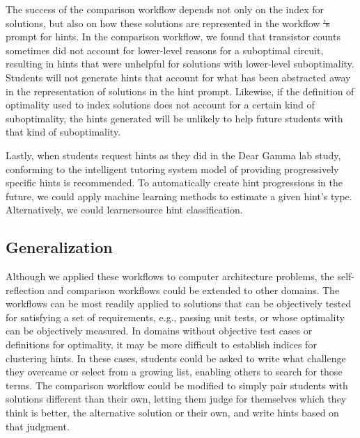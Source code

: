 \documentclass[12pt,twoside]{mitthesis}
\providecommand{\DIFdeltex}[1]{{\protect\color{red}\sout{#1}}}                      %
\providecommand{\DIFdelbegin}{} %
\providecommand{\DIFdelend}{} %
\providecommand{\DIFdel}[1]{\texorpdfstring{\DIFdeltex{#1}}{}} %
\begin{document}
The success of the comparison workflow depends not only on the index for solutions, but also on how these solutions are represented in the workflow \DIFdelbegin \DIFdel{'s }\DIFdelend prompt for hints. In the comparison workflow, we found that transistor counts sometimes did not account for lower-level reasons for a suboptimal circuit, resulting in hints that were unhelpful for solutions with lower-level suboptimality. Students will not generate hints that account for what has been abstracted away in the representation of solutions in the hint prompt. Likewise, if the definition of optimality used to index solutions does not account for a certain kind of suboptimality, the hints generated will be unlikely to help future students with that kind of suboptimality. 

Lastly, when students request hints as they did in the Dear Gamma lab study, conforming to the intelligent tutoring system model of providing progressively specific hints is recommended. To automatically create hint progressions in the future, we could apply machine learning methods to estimate a given hint's type. Alternatively, we could learnersource hint classification. 

\subsection{Generalization}
Although we applied these workflows to computer architecture problems, the self-reflection and comparison workflows could be extended to other domains. The workflows can be most readily applied to solutions that can be objectively tested for satisfying a set of requirements, e.g., passing unit tests, or whose optimality can be objectively measured. In domains without objective test cases or definitions for optimality, it may be more difficult to establish indices for clustering hints. In these cases, students could be asked to write what challenge they overcame or select from a growing list, enabling others to search for those terms. The comparison workflow could be modified to simply pair students with solutions different than their own, letting them judge for themselves which they think is better, the alternative solution or their own, and write hints based on that judgment.
\end{document}
